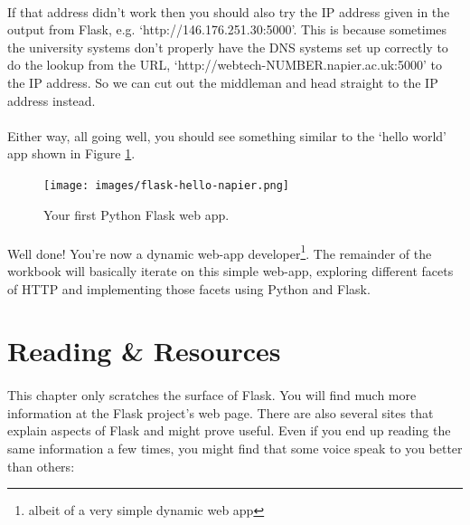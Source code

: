 \documentclass[12pt, a4paper, oneside]{book}
\begin{document}
\paragraph{} If that address didn't work then you should also try the IP address given in the output from Flask, e.g. `http://146.176.251.30:5000'. This is because sometimes the university systems don't properly have the DNS systems set up correctly to do the lookup from the URL, `http://webtech-NUMBER.napier.ac.uk:5000' to the IP address. So we can cut out the middleman and head straight to the IP address instead.

\paragraph{} Either way, all going well, you should see something similar to the `hello world' app shown in Figure \ref{fig:flask-hello-napier}.

\begin{figure}[H]
\centering
\texttt{[image: images/flask-hello-napier.png]}
\caption{Your first Python Flask web app.}
\label{fig:flask-hello-napier}
\end{figure}

\paragraph{} Well done! You're now a dynamic web-app developer\footnote{albeit of a very simple dynamic web app}. The remainder of the workbook will basically iterate on this simple web-app, exploring different facets of HTTP and implementing those facets using Python and Flask.


\section{Reading \& Resources}
\paragraph{} This chapter only scratches the surface of Flask. You will find much more information at the Flask project's web page. There are also several sites that explain aspects of Flask and might prove useful. Even if you end up reading the same information a few times, you might find that some voice speak to you better than others:
\end{document}
